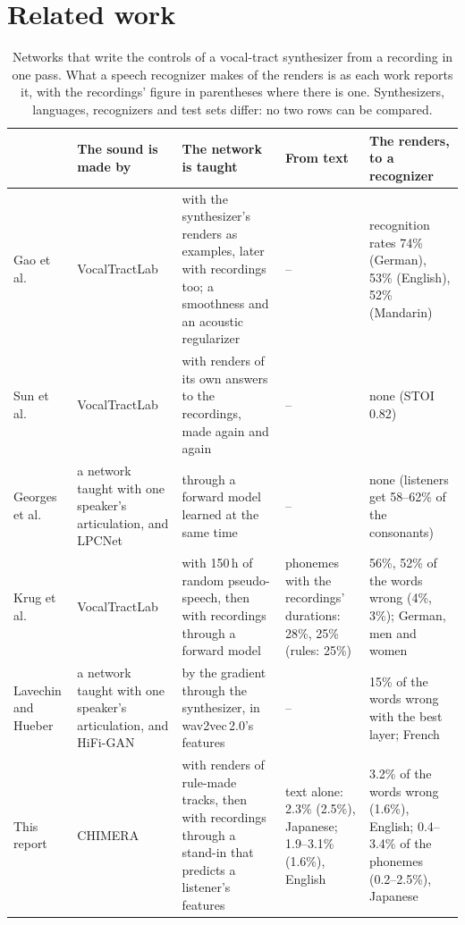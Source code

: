 \documentclass[10pt,a4paper,twocolumn]{article}
\begin{document}
\section{Related work}\label{sec:related}
\begin{table}[t]
\centering\footnotesize\setlength{\tabcolsep}{4pt}
\caption{Networks that write the controls of a vocal-tract synthesizer from a recording in one
pass. What a speech recognizer makes of the renders is as each work reports it, with the
recordings' figure in parentheses where there is one. Synthesizers, languages, recognizers and
test sets differ: no two rows can be compared.}
\label{tab:related}
\begin{tabular}{@{}p{25mm}p{27mm}p{50mm}p{27mm}p{31mm}@{}}
\toprule
& The sound is made by & The network is taught & From text & The renders, to a recognizer\\
\midrule
Gao et al.~\cite{gao} & VocalTractLab & with the synthesizer's renders as examples, later with
recordings too; a smoothness and an acoustic regularizer & -- & recognition rates 74\% (German), 53\% (English), 52\% (Mandarin)\\
\addlinespace
Sun et al.~\cite{sun} & VocalTractLab & with renders of its own answers to the recordings, made
again and again & -- & none (STOI 0.82)\\
\addlinespace
Georges et al.~\cite{georges} & a network taught with one speaker's articulation, and LPCNet &
through a forward model learned at the same time & -- & none (listeners get 58--62\% of the
consonants)\\
\addlinespace
Krug et al.~\cite{krug} & VocalTractLab & with 150\,h of random pseudo-speech, then with
recordings through a forward model & phonemes with the recordings' durations: 28\%, 25\%
(rules: 25\%) & 56\%, 52\% of the words wrong (4\%, 3\%); German, men and women\\
\addlinespace
Lavechin and Hueber~\cite{lavechin} & a network taught with one speaker's articulation, and
HiFi-GAN & by the gradient through the synthesizer, in wav2vec\,2.0's features & -- & 15\% of
the words wrong with the best layer; French\\
\addlinespace
This report & CHIMERA & with renders of rule-made tracks, then with recordings through a
stand-in that predicts a listener's features & text alone: 2.3\% (2.5\%), Japanese;
1.9--3.1\% (1.6\%), English & 3.2\% of the words wrong (1.6\%), English; 0.4--3.4\% of the
phonemes (0.2--2.5\%), Japanese\\
\bottomrule
\end{tabular}
\end{table}
\end{document}
